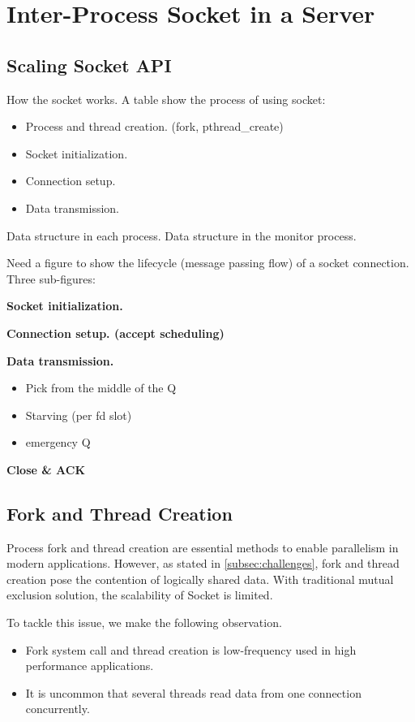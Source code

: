 \section{Inter-Process Socket in a Server}
\label{sec:intra-server}

\subsection{Scaling Socket API}
\label{subsec:socket-api}

How the socket works. A table show the process of using socket:

\begin{itemize}
	\item Process and thread creation. (fork, pthread\_create)
	\item Socket initialization.
	\item Connection setup.
	\item Data transmission.
\end{itemize}


Data structure in each process. Data structure in the monitor process.

Need a figure to show the lifecycle (message passing flow) of a socket connection. Three sub-figures:


	 \textbf{Socket initialization.}
	  
	 \textbf{Connection setup. (accept scheduling)}
	 
	 \textbf{Data transmission.}
\begin{itemize}
	\item Pick from the middle of the Q
	\item Starving (per fd slot)
	\item emergency Q
\end{itemize}

    \textbf{Close \& ACK}


\subsection{Fork and Thread Creation}
\label{subsec:fork}

Process fork and thread creation are essential methods to enable parallelism in modern applications. 
However, as stated in \ref{subsec:challenges}, fork and thread creation pose the contention of logically shared data. With traditional mutual exclusion solution, the scalability of Socket is limited.

To tackle this issue, we make the following observation.
\begin{itemize}
	\item Fork system call and thread creation is low-frequency used in high performance applications.
	\item It is uncommon that several threads read data from one connection concurrently.
\end{itemize} 

